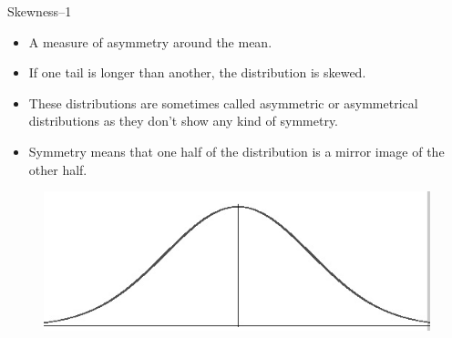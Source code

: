 \begin{frame}[t]{Skewness--1}
	\begin{itemize}
		\item A measure of asymmetry around the mean.
		\item If one tail is longer than another, the distribution is skewed.
		\item These distributions are sometimes called asymmetric or 
		asymmetrical distributions as they don’t show any kind of symmetry.
		\item Symmetry means that one half of the distribution is a mirror 
		image of the other half.
	\end{itemize}
\begin{figure} [ht]
	\centering
	\includegraphics[trim={0 0 0.1cm 0}, clip, 
	scale=0.5]{eda/normal-distribution-probability.jpg}
\end{figure}
\end{frame}

